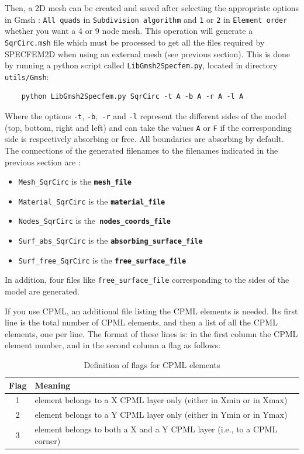 \documentclass[oneside,english,onecolumn,letterpaper]{book}
\begin{document}
Then, a 2D mesh can be created and saved after selecting the appropriate
options in Gmsh : \texttt{All quads} in \texttt{Subdivision algorithm}
and \texttt{1} or \texttt{2} in \texttt{Element order} whether you
want a 4 or 9 node mesh. This operation will generate a \texttt{SqrCirc.msh}
file which must be processed to get all the files required by SPECFEM2D
when using an external mesh (see previous section). This is done by
running a python script called \texttt{LibGmsh2Specfem.py}, located in
directory \texttt{utils/Gmsh}:
%
\begin{verbatim}
    python LibGmsh2Specfem.py SqrCirc -t A -b A -r A -l A
\end{verbatim}
%
Where the options \texttt{-t}, \texttt{-b},\texttt{ -r} and \texttt{-l}
represent the different sides of the model (top, bottom, right and
left) and can take the values \texttt{A} or \texttt{F} if the corresponding
side is respectively absorbing or free. All boundaries are absorbing
by default. The connections of the generated filenames to the filenames
indicated in the previous section are :
%
\begin{itemize}
\item \texttt{Mesh\_SqrCirc} is the \texttt{\textbf{mesh\_file}}
\item \texttt{Material\_SqrCirc} is the \texttt{\textbf{material\_file}}
\item \texttt{Nodes\_SqrCirc} is the\texttt{ }\texttt{\textbf{nodes\_coords\_file}}
\item \texttt{Surf\_abs\_SqrCirc} is the \texttt{\textbf{absorbing\_surface\_file}}
\item \texttt{Surf\_free\_SqrCirc} is the \texttt{\textbf{free\_surface\_file}}
\end{itemize}
%
In addition, four files like \texttt{free\_surface\_file} corresponding
to the sides of the model are generated.

If you use CPML, an additional file listing the CPML elements is needed.
Its first line is the total number of
CPML elements, and then a list of all the CPML elements, one per line.
The format of these lines is: in the first column the CPML element number, and in the second column a flag as follows:

\begin{table}[hb]
\caption{Definition of flags for CPML elements}
\centering
\begin{tabular}{c l}
\hline\hline
Flag& Meaning\\ [0.5ex]
\hline
1 & element belongs to a X CPML layer only (either in Xmin or in Xmax)\\
2 & element belongs to a Y CPML layer only (either in Ymin or in Ymax)\\
3 & element belongs to both a X and a Y CPML layer (i.e., to a CPML corner)\\ [1ex]
\hline
\end{tabular}
\label{table:CPMLflags}
\end{table}
\end{document}
